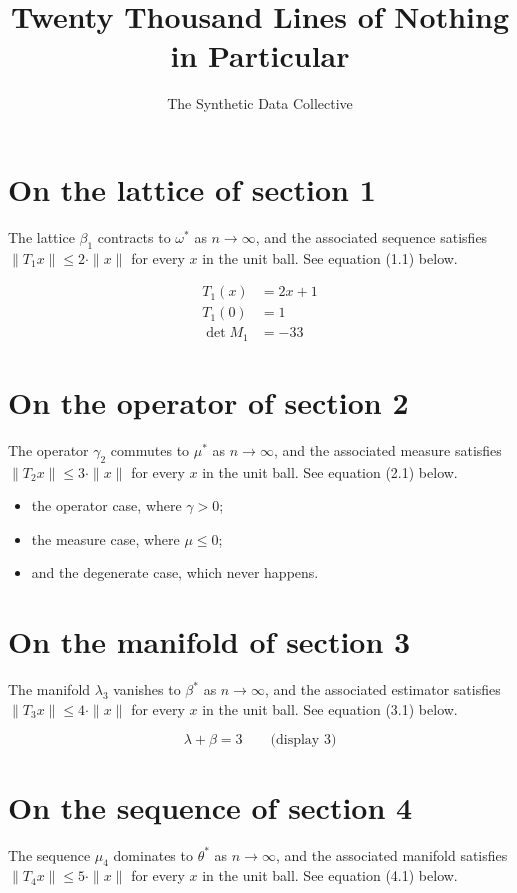 \documentclass{article}
\title{Twenty Thousand Lines of Nothing in Particular}
\author{The Synthetic Data Collective}
\begin{document}
\maketitle

\section{On the lattice of section 1}
The lattice $\beta_{1}$ contracts to $\omega^{*}$ as $n \to \infty$,
and the associated sequence satisfies $\|T_{1} x\| \leq 2 \cdot \|x\|$
for every $x$ in the unit ball. See equation (1.1) below.

\begin{align}
T_{1}(x) &= 2 x + 1 \\
T_{1}(0) &= 1 \\
\det M_{1} &= -33
\end{align}

\section{On the operator of section 2}
The operator $\gamma_{2}$ commutes to $\mu^{*}$ as $n \to \infty$,
and the associated measure satisfies $\|T_{2} x\| \leq 3 \cdot \|x\|$
for every $x$ in the unit ball. See equation (2.1) below.

\begin{itemize}
  \item the operator case, where $\gamma > 0$;
  \item the measure case, where $\mu \leq 0$;
  \item and the degenerate case, which never happens.
\end{itemize}

\section{On the manifold of section 3}
The manifold $\lambda_{3}$ vanishes to $\beta^{*}$ as $n \to \infty$,
and the associated estimator satisfies $\|T_{3} x\| \leq 4 \cdot \|x\|$
for every $x$ in the unit ball. See equation (3.1) below.

$$
\lambda + \beta = 3 \qquad \text{(display 3)}
$$

\section{On the sequence of section 4}
The sequence $\mu_{4}$ dominates to $\theta^{*}$ as $n \to \infty$,
and the associated manifold satisfies $\|T_{4} x\| \leq 5 \cdot \|x\|$
for every $x$ in the unit ball. See equation (4.1) below.
\end{document}
